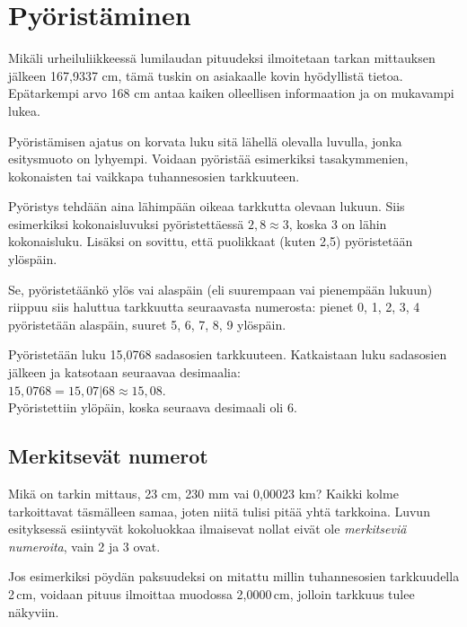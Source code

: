 \section*{Pyöristäminen}

Mikäli urheiluliikkeessä lumilaudan pituudeksi ilmoitetaan tarkan mittauksen jälkeen 167,9337 cm, tämä tuskin on asiakaalle kovin hyödyllistä tietoa. Epätarkempi arvo 168 cm antaa kaiken olleellisen informaation ja on mukavampi lukea.

Pyöristämisen ajatus on korvata luku sitä lähellä olevalla luvulla, jonka esitysmuoto on lyhyempi. Voidaan pyöristää
esimerkiksi tasakymmenien, kokonaisten tai vaikkapa tuhannesosien
tarkkuuteen.

Pyöristys tehdään aina lähimpään oikeaa tarkkutta olevaan lukuun. Siis esimerkiksi kokonaisluvuksi pyöristettäessä $2,8 \approx 3$, koska 3 on lähin kokonaisluku. Lisäksi on sovittu, että
puolikkaat (kuten 2,5) pyöristetään ylöspäin.

Se, pyöristetäänkö ylös vai alaspäin (eli suurempaan vai
pienempään lukuun) riippuu siis haluttua tarkkuutta
seuraavasta numerosta: pienet
0, 1, 2, 3, 4 pyöristetään alaspäin, suuret 5, 6, 7, 8, 9 ylöspäin.

\begin{esimerkki}
Pyöristetään luku 15,0768 sadasosien tarkkuuteen. Katkaistaan
luku sadasosien jälkeen ja katsotaan seuraavaa desimaalia:\\
$15,0768 = 15,07|68 \approx 15,08$.\\
Pyöristettiin ylöpäin, koska seuraava desimaali oli 6.
\end{esimerkki}

\subsection*{Merkitsevät numerot}

Mikä on tarkin mittaus, 23 cm, 230 mm vai 0,00023 km? Kaikki kolme tarkoittavat täsmälleen samaa, joten niitä tulisi pitää
yhtä tarkkoina. Luvun esityksessä esiintyvät kokoluokkaa ilmaisevat nollat eivät ole \emph{merkitseviä numeroita}, vain
2 ja 3 ovat.


Jos esimerkiksi pöydän paksuudeksi on mitattu millin tuhannesosien
tarkkuudella 2\,cm, voidaan pituus ilmoittaa muodossa 2,0000\,cm, jolloin tarkkuus tulee näkyviin. 

